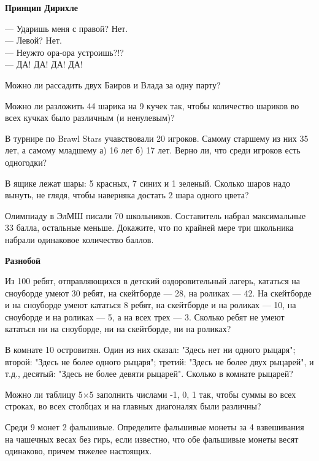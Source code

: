 \centerline{\bf \Huge Принцип Дирихле}


\begin{flushright}
        \scriptsize{— Ударишь меня с правой? Нет.\\
                    — Левой? Нет.\\
                    — Неужто ора-ора устроишь?!?\\
                    — ДА! ДА! ДА! ДА!}
\end{flushright}


Можно ли рассадить двух Баиров и Влада за одну парту?

Можно ли разложить 44 шарика на 9 кучек так, чтобы количество шариков во всех кучках было различным (и ненулевым)?

В турнире по Brawl Stars учавствовали 20 игроков. Самому старшему из них 35 лет, а самому младшему а) 16 лет б) 17 лет. Верно ли, что среди игроков есть одногодки?

В ящике лежат шары: 5 красных, 7 синих и 1 зеленый. Сколько шаров надо вынуть, не глядя, чтобы наверняка достать 2 шара одного цвета?


Олимпиаду в ЭлМШ писали 70 школьников. Составитель набрал максимальные 33 балла, остальные меньше. Докажите, что по крайней мере три школьника набрали одинаковое количество баллов.
\newline

\centerline{\bf \Huge Разнобой}

Из 100 ребят, отправляющихся в детский оздоровительный лагерь, кататься на сноуборде умеют 30 ребят, на скейтборде — 28, на роликах — 42. На скейтборде и на сноуборде умеют кататься 8 ребят, на скейтборде и на роликах — 10, на сноуборде и на роликах — 5, а на всех трех — 3. Сколько ребят не умеют кататься ни на сноуборде, ни на скейтборде, ни на роликах?

В комнате 10 островитян. Один из них сказал: "Здесь нет ни одного рыцаря"; второй: "Здесь не более одного рыцаря"; третий: "Здесь не более двух рыцарей", и т.д., десятый: "Здесь не более девяти рыцарей". Сколько в комнате рыцарей?

Можно ли таблицу 5×5 заполнить числами -1, 0, 1 так, чтобы суммы во всех строках, во всех столбцах и на главных диагоналях были различны?

Среди 9 монет 2 фальшивые. Определите фальшивые монеты за 4 взвешивания на чашечных весах без гирь, если известно, что обе фальшивые монеты весят одинаково, причем тяжелее настоящих.